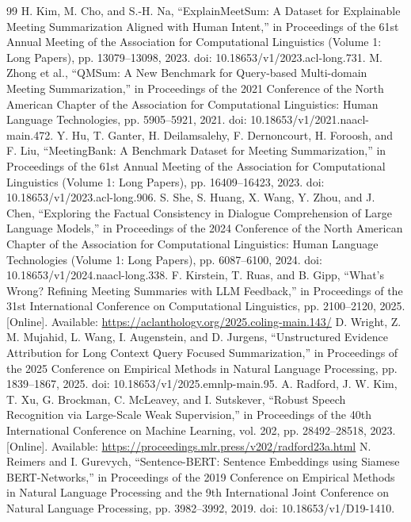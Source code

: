 \documentclass[journal]{IEEEtran}
\begin{document}
\begin{thebibliography}{99}
 H. Kim, M. Cho, and S.-H. Na, ``ExplainMeetSum: A Dataset for Explainable Meeting Summarization Aligned with Human Intent,'' in Proceedings of the 61st Annual Meeting of the Association for Computational Linguistics (Volume 1: Long Papers), pp. 13079--13098, 2023. doi: 10.18653/v1/2023.acl-long.731.
 M. Zhong et al., ``QMSum: A New Benchmark for Query-based Multi-domain Meeting Summarization,'' in Proceedings of the 2021 Conference of the North American Chapter of the Association for Computational Linguistics: Human Language Technologies, pp. 5905--5921, 2021. doi: 10.18653/v1/2021.naacl-main.472.
 Y. Hu, T. Ganter, H. Deilamsalehy, F. Dernoncourt, H. Foroosh, and F. Liu, ``MeetingBank: A Benchmark Dataset for Meeting Summarization,'' in Proceedings of the 61st Annual Meeting of the Association for Computational Linguistics (Volume 1: Long Papers), pp. 16409--16423, 2023. doi: 10.18653/v1/2023.acl-long.906.
 S. She, S. Huang, X. Wang, Y. Zhou, and J. Chen, ``Exploring the Factual Consistency in Dialogue Comprehension of Large Language Models,'' in Proceedings of the 2024 Conference of the North American Chapter of the Association for Computational Linguistics: Human Language Technologies (Volume 1: Long Papers), pp. 6087--6100, 2024. doi: 10.18653/v1/2024.naacl-long.338.
 F. Kirstein, T. Ruas, and B. Gipp, ``What's Wrong? Refining Meeting Summaries with LLM Feedback,'' in Proceedings of the 31st International Conference on Computational Linguistics, pp. 2100--2120, 2025. [Online]. Available: \url{https://aclanthology.org/2025.coling-main.143/}
 D. Wright, Z. M. Mujahid, L. Wang, I. Augenstein, and D. Jurgens, ``Unstructured Evidence Attribution for Long Context Query Focused Summarization,'' in Proceedings of the 2025 Conference on Empirical Methods in Natural Language Processing, pp. 1839--1867, 2025. doi: 10.18653/v1/2025.emnlp-main.95.
 A. Radford, J. W. Kim, T. Xu, G. Brockman, C. McLeavey, and I. Sutskever, ``Robust Speech Recognition via Large-Scale Weak Supervision,'' in Proceedings of the 40th International Conference on Machine Learning, vol. 202, pp. 28492--28518, 2023. [Online]. Available: \url{https://proceedings.mlr.press/v202/radford23a.html}
 N. Reimers and I. Gurevych, ``Sentence-BERT: Sentence Embeddings using Siamese BERT-Networks,'' in Proceedings of the 2019 Conference on Empirical Methods in Natural Language Processing and the 9th International Joint Conference on Natural Language Processing, pp. 3982--3992, 2019. doi: 10.18653/v1/D19-1410.

\end{thebibliography}
\end{document}

